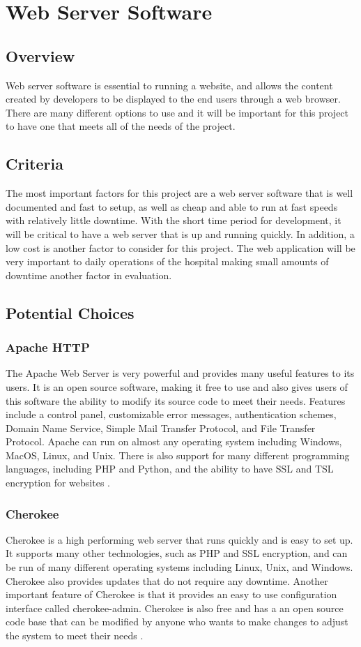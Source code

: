 \documentclass[onecolumn, draftclsnofoot,10pt, compsoc]{IEEEtran}
\begin{document}
\section{Web Server Software}

\subsection{Overview}
Web server software is essential to running a website, and allows the content created by developers to be displayed to the end users through a web browser. There are many different options to use and it will be important for this project to have one that meets all of the needs of the project.
\subsection{Criteria}
The most important factors for this project are a web server software that is well documented and fast to setup, as well as cheap and able to run at fast speeds with relatively little downtime. With the short time period for development, it will be critical to have a web server that is up and running quickly. In addition, a low cost is another factor to consider for this project. The web application will be very important to daily operations of the hospital making small amounts of downtime another factor in evaluation.
\subsection{Potential Choices}

\subsubsection{Apache HTTP}
The Apache Web Server is very powerful and provides many useful features to its users. It is an open source software, making it free to use and also gives users of this software the ability to modify its source code to meet their needs. Features include a control panel, customizable error messages, authentication schemes, Domain Name Service, Simple Mail Transfer Protocol, and File Transfer Protocol. Apache can run on almost any operating system including Windows, MacOS, Linux, and Unix. There is also support for many different programming languages, including PHP and Python, and the ability to have SSL and TSL encryption for websites \cite{apache}.

\subsubsection{Cherokee}
Cherokee is a high performing web server that runs quickly and is easy to set up. It supports many other technologies, such as PHP and SSL encryption, and can be run of many different operating systems including Linux, Unix, and Windows. Cherokee also provides updates that do not require any downtime. Another important feature of Cherokee is that it provides an easy to use configuration interface called cherokee-admin. Cherokee is also free and has a an open source code base that can be modified by anyone who wants to make changes to adjust the system to meet their needs \cite{cherokee}.
\end{document}
